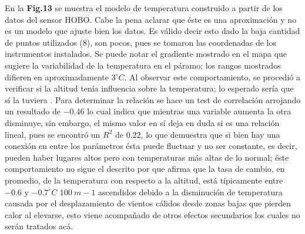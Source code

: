 \documentclass[conference,final,]{IEEEtran}
\begin{document}
En la \textbf{Fig.13} se muestra el modelo de temperatura construido a
partir de los datos del sensor HOBO. Cabe la pena aclarar que éste es
una aproximación y no es un modelo que ajuste bien los datos. Es válido
decir esto dado la baja cantidad de puntos utilizados (\(8\)), son
pocos, pues se tomaron las coordenadas de los instrumentos instalados.
Se puede notar el gradiente mostrado en el mapa que sugiere la
variabilidad de la temperatura en el páramo; los rangos mostrados
difieren en aproximadamente \(3^{\circ}C\). Al observar este
comportamiento, se procedió a verificar si la altitud tenía influencia
sobre la temperatura; lo esperado sería que sí la tuviera
\cite{basantes}. Para determinar la relación se hace un test de
correlación arrojando un resultado de \(-0.46\) lo cual indica que
mientras una variable aumenta la otra disminuye, sin embargo, el mismo
valor en sí deja en duda si es una relación lineal, pues se encontró un
\(R^2\) de \(0.22\), lo que demuestra que si bien hay una conexión en
entre los parámetros ésta puede fluctuar y no ser constante, es decir,
pueden haber lugares altos pero con temperaturas más altas de lo normal;
éste comportamiento no sigue el descrito por \cite{van} que afirma que
la tasa de cambio, en promedio, de la temperatura con respecto a la
altitud, está típicamente entre \(-0.6\) y \(-0.7^{\circ}C\)
\(100 \ m-1\) ascendidos debido a la disminución de temperatura causada
por el desplazamiento de vientos cálidos desde zonas bajas que pierden
calor al elevarse, esto viene acompañado de otros efectos secundarios
\cite{buyta} los cuales no serán tratados acá.
\end{document}
